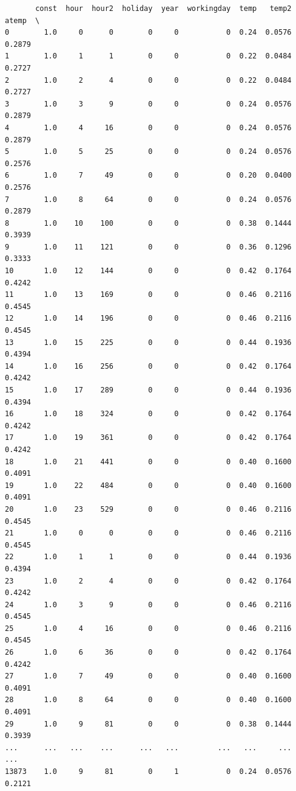 \documentclass[11pt]{article}
\begin{document}
    
    \begin{verbatim}
       const  hour  hour2  holiday  year  workingday  temp   temp2   atemp  \
0        1.0     0      0        0     0           0  0.24  0.0576  0.2879   
1        1.0     1      1        0     0           0  0.22  0.0484  0.2727   
2        1.0     2      4        0     0           0  0.22  0.0484  0.2727   
3        1.0     3      9        0     0           0  0.24  0.0576  0.2879   
4        1.0     4     16        0     0           0  0.24  0.0576  0.2879   
5        1.0     5     25        0     0           0  0.24  0.0576  0.2576   
6        1.0     7     49        0     0           0  0.20  0.0400  0.2576   
7        1.0     8     64        0     0           0  0.24  0.0576  0.2879   
8        1.0    10    100        0     0           0  0.38  0.1444  0.3939   
9        1.0    11    121        0     0           0  0.36  0.1296  0.3333   
10       1.0    12    144        0     0           0  0.42  0.1764  0.4242   
11       1.0    13    169        0     0           0  0.46  0.2116  0.4545   
12       1.0    14    196        0     0           0  0.46  0.2116  0.4545   
13       1.0    15    225        0     0           0  0.44  0.1936  0.4394   
14       1.0    16    256        0     0           0  0.42  0.1764  0.4242   
15       1.0    17    289        0     0           0  0.44  0.1936  0.4394   
16       1.0    18    324        0     0           0  0.42  0.1764  0.4242   
17       1.0    19    361        0     0           0  0.42  0.1764  0.4242   
18       1.0    21    441        0     0           0  0.40  0.1600  0.4091   
19       1.0    22    484        0     0           0  0.40  0.1600  0.4091   
20       1.0    23    529        0     0           0  0.46  0.2116  0.4545   
21       1.0     0      0        0     0           0  0.46  0.2116  0.4545   
22       1.0     1      1        0     0           0  0.44  0.1936  0.4394   
23       1.0     2      4        0     0           0  0.42  0.1764  0.4242   
24       1.0     3      9        0     0           0  0.46  0.2116  0.4545   
25       1.0     4     16        0     0           0  0.46  0.2116  0.4545   
26       1.0     6     36        0     0           0  0.42  0.1764  0.4242   
27       1.0     7     49        0     0           0  0.40  0.1600  0.4091   
28       1.0     8     64        0     0           0  0.40  0.1600  0.4091   
29       1.0     9     81        0     0           0  0.38  0.1444  0.3939   
...      ...   ...    ...      ...   ...         ...   ...     ...     ...   
13873    1.0     9     81        0     1           0  0.24  0.0576  0.2121   

\end{verbatim}
\end{document}
